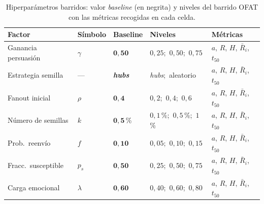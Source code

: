 \begin{table}[ht]
  \centering
  \small
  \caption{Hiperparámetros barridos: valor \emph{baseline} (en negrita) y niveles del barrido OFAT con las métricas recogidas en cada celda.}
  \label{tab:barridos}
  \begin{tabular}{@{}l p{1.8cm} p{1.8cm} p{4.8cm} p{3.0cm}@{}}
    \toprule
    \textbf{Factor} & \textbf{Símbolo} & \textbf{Baseline} & \textbf{Niveles} & \textbf{Métricas} \\
    \midrule
    Ganancia persuasión & $\gamma$ & $\mathbf{0{,}50}$ & $0{,}25$;\ $0{,}50$;\ $0{,}75$ & $a$, $R$, $H$, $\bar{R}_i$, $t_{50}$ \\
    \addlinespace
    Estrategia semilla & --- & \textbf{\emph{hubs}} & \emph{hubs};\ aleatorio & $a$, $R$, $H$, $\bar{R}_i$, $t_{50}$ \\
    \addlinespace
    Fanout inicial & $\rho$ & $\mathbf{0{,}4}$ & $0{,}2$;\ $0{,}4$;\ $0{,}6$ & $a$, $R$, $H$, $\bar{R}_i$, $t_{50}$ \\
    \addlinespace
    Número de semillas & $k$ & $\mathbf{0{,}5}$\,\% & $0{,}1$\,\%;\ $0{,}5$\,\%;\ $1$\,\% & $a$, $R$, $H$, $\bar{R}_i$, $t_{50}$ \\
    \addlinespace
    Prob.\ reenvío & $f$ & $\mathbf{0{,}10}$ & $0{,}05$;\ $0{,}10$;\ $0{,}15$ & $a$, $R$, $H$, $\bar{R}_i$, $t_{50}$ \\
    \addlinespace
    Fracc.\ susceptible & $p_s$ & $\mathbf{0{,}50}$ & $0{,}25$;\ $0{,}50$;\ $0{,}75$ & $a$, $R$, $H$, $\bar{R}_i$, $t_{50}$ \\
    \addlinespace
    Carga emocional & $\lambda$ & $\mathbf{0{,}60}$ & $0{,}40$;\ $0{,}60$;\ $0{,}80$ & $a$, $R$, $H$, $\bar{R}_i$, $t_{50}$ \\
    \bottomrule
  \end{tabular}
\end{table}

